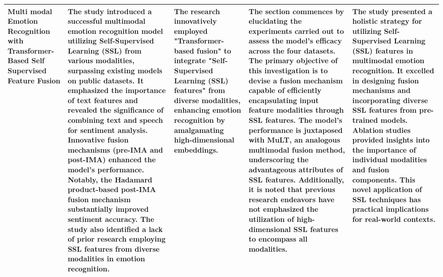 \documentclass[conference]{IEEEtran}
\begin{document}
\begin{longtable}
\begin{tabularx}{\textwidth}{|>{\raggedright\arraybackslash}X|>{\raggedright\arraybackslash}X|>{\raggedright\arraybackslash}X|>{\raggedright\arraybackslash}X|>{\raggedright\arraybackslash}X|}
Multi modal Emotion Recognition with Transformer-Based Self Supervised Feature Fusion &The study introduced a successful multimodal emotion recognition model utilizing Self-Supervised Learning (SSL) from various modalities, surpassing existing models on public datasets. It emphasized the importance of text features and revealed the significance of combining text and speech for sentiment analysis. Innovative fusion mechanisms (pre-IMA and post-IMA) enhanced the model's performance. Notably, the Hadamard product-based post-IMA fusion mechanism substantially improved sentiment accuracy. The study also identified a lack of prior research employing SSL features from diverse modalities in emotion recognition.  & The research innovatively employed "Transformer-based fusion" to integrate "Self-Supervised Learning (SSL) features" from diverse modalities, enhancing emotion recognition by amalgamating high-dimensional embeddings. & The section commences by elucidating the experiments carried out to assess the model's efficacy across the four datasets. The primary objective of this investigation is to devise a fusion mechanism capable of efficiently encapsulating input feature modalities through SSL features. The model's performance is juxtaposed with MuLT, an analogous multimodal fusion method, underscoring the advantageous attributes of SSL features. Additionally, it is noted that previous research endeavors have not emphasized the utilization of high-dimensional SSL features to encompass all modalities.& The study presented a holistic strategy for utilizing Self-Supervised Learning (SSL) features in multimodal emotion recognition. It excelled in designing fusion mechanisms and incorporating diverse SSL features from pre-trained models. Ablation studies provided insights into the importance of individual modalities and fusion components. This novel application of SSL techniques has practical implications for real-world contexts.\\
\hline

\end{tabularx}
\end{longtable}
\end{document}
